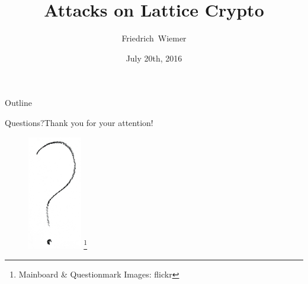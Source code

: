 \documentclass[12pt,mathserif,professionalfont]{beamer}
\title{Attacks on Lattice Crypto}
\subtitle{}
\author[Friedrich~Wiemer]{Friedrich~Wiemer}
\institute{%
    FluxFingers\\[0.5em]
    Workgroup Symmetric Cryptography\\
    Ruhr University Bochum
}
\date{July 20th, 2016}
\newcommand{\blfootnote}[1]{%
	\begingroup
	\renewcommand\thefootnote{}\footnote{#1}%
	\addtocounter{footnote}{-1}%
	\endgroup
}
\begin{document}
\begin{frame}
	\titlepage{}
\end{frame}

\begin{frame}{Outline}
	\tableofcontents
\end{frame}



\begin{frame}{Questions?}{Thank you for your attention!}
	\begin{figure}[!htb]
		\includegraphics[height=50mm]{data/flickr/questionmark.png}\blfootnote{\scriptsize Mainboard \& Questionmark Images: flickr}
	\end{figure}
\end{frame}

\end{document}
